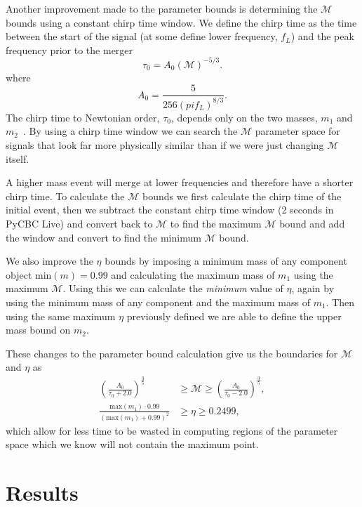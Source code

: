 Another improvement made to the parameter bounds is determining the $\mathcal{M}$ bounds using a constant chirp time window. We define the chirp time as the time between the start of the signal (at some define lower frequency, $f_{L}$) and the peak frequency prior to the merger
%
\begin{equation}
    \tau_0 = A_{0}\left(\mathcal{M}\right)^{-5/3}.
\end{equation}
%
where
%
\begin{equation}
    A_{0} = \frac{5}{256 \left(pi f_{L}\right)^{8/3}}.
\end{equation}
%
The chirp time to Newtonian order, $\tau_{0}$, depends only on the two masses, $m_{1}$ and $m_{2}$~\cite{Cokelaer:2007}. By using a chirp time window we can search the $\mathcal{M}$ parameter space for signals that look far more physically similar than if we were just changing $\mathcal{M}$ itself.

A higher mass \gwadj event will merge at lower frequencies and therefore have a shorter chirp time. To calculate the $\mathcal{M}$ bounds we first calculate the chirp time of the initial event, then we subtract the constant chirp time window ($2$ seconds in PyCBC Live) and convert back to $\mathcal{M}$ to find the maximum $\mathcal{M}$ bound and add the window and convert to find the minimum $\mathcal{M}$ bound.

We also improve the $\eta$ bounds by imposing a minimum mass of any component object $\text{min}(m) = 0.99$ and calculating the maximum mass of $m_{1}$ using the maximum $\mathcal{M}$. Using this we can calculate the \textit{minimum} value of $\eta$, again by using the minimum mass of any component and the maximum mass of $m_{1}$. Then using the same maximum $\eta$ previously defined we are able to define the upper mass bound on $m_{2}$.

These changes to the parameter bound calculation give us the boundaries for $\mathcal{M}$ and $\eta$ as
%
\begin{align}
    \left(\frac{A_{0}}{\tau_{0} + 2.0}\right)^{\frac{3}{5}} &\ge \mathcal{M} \ge \left(\frac{A_{0}}{\tau_{0} - 2.0}\right)^{\frac{3}{5}}, \\[10pt]
    \frac{\text{max}(m_{1}) \cdot 0.99}{(\text{max}(m_{1}) + 0.99)^{2}} &\ge \eta \ge 0.2499,
\end{align}
%
which allow for less time to be wasted in computing regions of the parameter space which we know will not contain the maximum point.

\section{\label{7:sec:results}Results}



